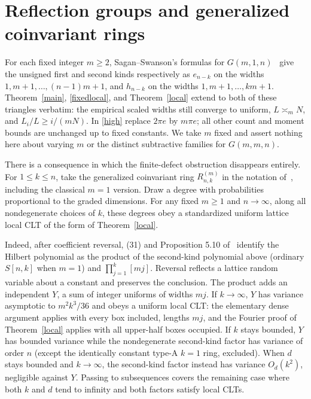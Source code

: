 \documentclass[11pt]{article}
\begin{document}
\section{Reflection groups and generalized coinvariant rings}
For each fixed integer $m\ge2$, Sagan--Swanson's formulas for $G(m,1,n)$~\cite{groups} give the unsigned first and second kinds respectively as $e_{n-k}$ on the widths $1,m+1,\ldots,(n-1)m+1$, and $h_{n-k}$ on the widths $1,m+1,\ldots,km+1$. Theorem~\ref{main}, \eqref{fixedlocal}, and Theorem~\ref{local} extend to both of these triangles verbatim: the empirical scaled widths still converge to uniform, $L\asymp_m N$, and $L_i/L\ge i/(mN)$. In \eqref{high} replace $2\pi e$ by $m\pi e$; all other count and moment bounds are unchanged up to fixed constants. We take $m$ fixed and assert nothing here about varying $m$ or the distinct subtractive families for $G(m,m,n)$.
 
There is a consequence in which the finite-defect obstruction disappears entirely. For $1\le k\le n$, take the generalized coinvariant ring $R^{(m)}_{n,k}$ in the notation of~\cite{groups}, including the classical $m=1$ version. Draw a degree with probabilities proportional to the graded dimensions. For any fixed $m\ge1$ and $n\to\infty$, along all nondegenerate choices of $k$, these degrees obey a standardized uniform lattice local CLT of the form of Theorem~\ref{local}.
 
Indeed, after coefficient reversal, (31) and Proposition 5.10 of~\cite{groups} identify the Hilbert polynomial as the product of the second-kind polynomial above (ordinary $S[n,k]$ when $m=1$) and $\prod_{j=1}^k[mj]$. Reversal reflects a lattice random variable about a constant and preserves the conclusion. The product adds an independent $Y$, a sum of integer uniforms of widths $mj$. If $k\to\infty$, $Y$ has variance asymptotic to $m^2 k^3/36$ and obeys a uniform local CLT: the elementary dense argument applies with every box included, lengths $mj$, and the Fourier proof of Theorem~\ref{local} applies with all upper-half boxes occupied. If $k$ stays bounded, $Y$ has bounded variance while the nondegenerate second-kind factor has variance of order $n$ (except the identically constant type-A $k=1$ ring, excluded). When $d$ stays bounded and $k\to\infty$, the second-kind factor instead has variance $O_d(k^2)$, negligible against $Y$. Passing to subsequences covers the remaining case where both $k$ and $d$ tend to infinity and both factors satisfy local CLTs.
 
\end{document}

